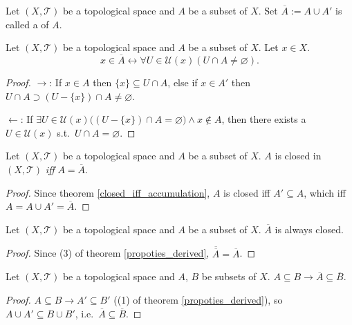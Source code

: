 \documentclass[openany]{book}
\begin{document}
\begin{definition}\label{closure}
Let $(X,\mathscr T)$ be a topological space and $A$ be a subset of $X$. Set $\overline A := A\cup A'$ is called a  of $A$.
\end{definition}

\begin{theorem}\label{closure_neighbourhood}
Let $(X,\mathscr T)$ be a topological space and $A$ be a subset of $X$. Let $x\in X$.
\[
	x\in \overline A \leftrightarrow
		\forall U\in\mathscr U(x)(
			U\cap A\neq \varnothing).
\]
\end{theorem}
\begin{proof}
$\to$: If $x\in A$ then $\{x\}\subseteq U\cap A$, 
else if $x\in A'$ then $U\cap A \supset (U-\{x\})\cap A \neq \varnothing$.

$\leftarrow$: 
If $\exists U\in\mathscr U(x)\big(
	(U-\{x\})\cap A= \varnothing\big)\wedge x\notin A$, 
then there exists a $U\in \mathscr U(x)$ s.t.\ $U\cap A=\varnothing$. 
\end{proof}


\begin{theorem}\label{closed_iff_closure}
Let $(X,\mathscr T)$ be a topological space and $A$ be a subset of $X$. 
$A$ is closed in $(X,\mathscr T)$ \emph{iff} $A=\overline A$.
\end{theorem}
\begin{proof}
Since theorem \ref{closed_iff_accumulation}, $A$ is closed iff $A'\subseteq A$, which iff $A = A\cup A' = \overline A$.
\end{proof}

\begin{corollary}\label{closure_closed}
Let $(X,\mathscr T)$ be a topological space and $A$ be a subset of $X$. 
$\overline A$ is always closed.
\end{corollary}
\begin{proof}
Since (3) of theorem \ref{propoties_derived}, $\overline{\overline A} = \overline A$.
\end{proof}

\begin{lemma}\label{subset_closure}
Let $(X,\mathscr T)$ be a topological space and $A$, $B$ be subsets of $X$.
$A\subseteq B \to \overline A\subseteq \overline B$.
\end{lemma}
\begin{proof}
$A\subseteq B \to A'\subseteq B'$ ((1) of theorem \ref{propoties_derived}), so $A\cup A'\subseteq B\cup B'$, i.e.\ $\overline A\subseteq \overline B$.
\end{proof}
\end{document}
